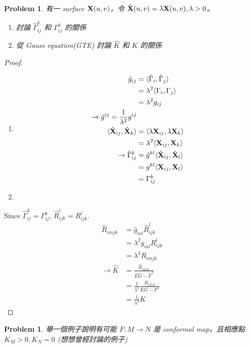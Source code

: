 \documentclass[10pt,a4paper]{article}
\newcounter{theProblemCounter}
\newtheorem{problem}[theProblemCounter]{Problem}
\begin{document}
\setcounter{theProblemCounter}{5}
\begin{problem}
有一 surface $\mathbf{X}(u, v)$，令 $\hat{\mathbf{X}}(u, v)=\lambda \mathbf{X}(u,v), \lambda > 0$。
\begin{enumerate}
\item[(a)] 討論 $\hat{\Gamma}^k_{ij}$ 和 $\Gamma^k_{ij}$ 的關係
\item[(b)] 從 Gauss equation(GTE) 討論 $\hat{K}$ 和 $K$ 的關係
\end{enumerate}
\end{problem}
\begin{proof}
\begin{enumerate}
\item[(a)]
\begin{align*}
\hat{g}_{ij}&=\langle\hat{\Gamma}_i,\hat{\Gamma}_j\rangle\\
&=\lambda^2\langle\Gamma_i,\Gamma_j\rangle\\
&=\lambda^2 g_{ij}\\
\rightarrow \hat{g}^{ij}=\frac{1}{\lambda^2}g^{ij}\\
\langle\hat{\mathbf{X}}_{ij},\hat{\mathbf{X}}_k\rangle&=\langle\lambda\mathbf{X}_{ij},\lambda \mathbf{X}_k\rangle\\
&=\lambda^2\langle\mathbf{X}_{ij},\mathbf{X}_k\rangle\\
\rightarrow \hat{\Gamma}_{ij}^k&=\hat{g}^{kl}\langle\hat{\mathbf{X}}_{ij},\hat{\mathbf{X}}_l\rangle\\
&=g^{kl}\langle\mathbf{X}_{ij},\mathbf{X}_l\rangle\\
&=\Gamma_{ij}^k
\end{align*}
\item[(b)]
\end{enumerate}
Since $\hat{\Gamma}_{ij}^k=\Gamma_{ij}^k$, $\hat{R}_{ijk}^l=R_{ijk}^l$.\\
\begin{align*}
\hat{R}_{imjk}&=\hat{g}_{ml}\hat{R}_{ijk}^l\\
&=\lambda^2 g_{ml}R_{ijk}^l\\
&=\lambda^2 R_{imjk}\\
\rightarrow \hat{K}&=\frac{\hat{R}_{1212}}{\hat{E}\hat{G}-\hat{F}^2}\\
&=\frac{1}{\lambda^2}\frac{R_{1212}}{EG-F^2}\\
&=\frac{1}{\lambda^2}K
\end{align*}
\end{proof}
\setcounter{theProblemCounter}{8}
\begin{problem}
舉一個例子說明有可能 $F:M\to N$ 是 conformal map，且相應點 $K_M>0, K_N=0$ (想想曾經討論的例子)
\end{problem}
\end{document}
